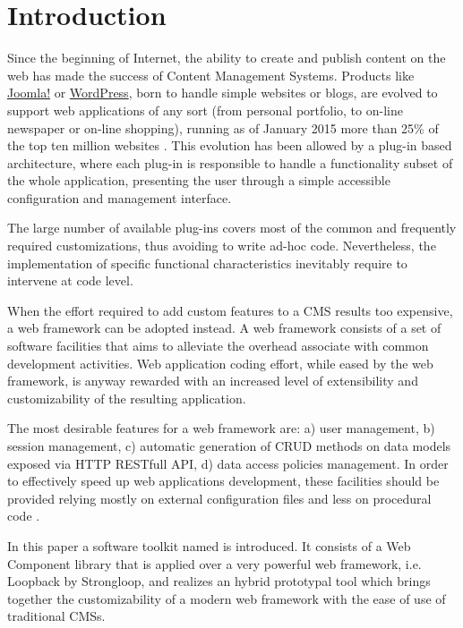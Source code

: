 \section{Introduction}\label{sec:introduction}

Since the beginning of Internet, the ability to create and publish content on the web has made the success of Content Management Systems. Products like \href{http://www.joomla.org/}{Joomla!} or \href{https://wordpress.org/}{WordPress}, born to handle simple websites or blogs, are evolved to support web applications of any sort (from personal portfolio, to on-line newspaper or on-line shopping), running as of January 2015 more than 25\% of the top ten million websites \cite{usage-cms}. This evolution has been allowed by a plug-in based architecture, where each plug-in is responsible to handle a functionality subset of the whole application, presenting the user through a simple accessible configuration and management interface.

The large number of available plug-ins covers most of the common and frequently required customizations, thus avoiding to write ad-hoc code. Nevertheless, the implementation of specific functional characteristics inevitably require to intervene at code level.

When the effort required to add custom features to a CMS results too expensive, a web framework can be adopted instead. A web framework consists of a set of software facilities that aims to alleviate the overhead associate with common development activities. Web application coding effort, while eased by the web framework, is anyway rewarded with an increased level of extensibility and customizability of the resulting application.

The most desirable features for a web framework are: a) user management, b) session management, c) automatic generation of CRUD methods on data models exposed via HTTP RESTfull API, d) data access policies management. In order to effectively speed up web applications development, these facilities should be provided relying mostly on external configuration files and less on procedural code \cite{6859693}.

In this paper a software toolkit named  is introduced. It consists of a Web Component library that is applied over a very powerful web framework, i.e. Loopback by Strongloop, and realizes an hybrid prototypal tool which brings together the customizability of a modern web framework with the ease of use of traditional CMSs.

